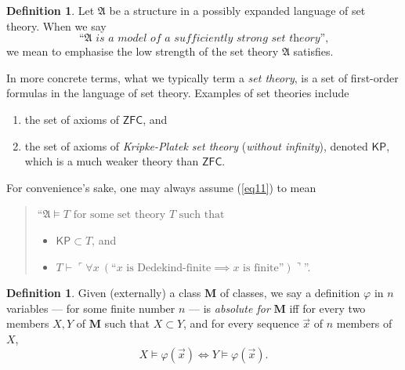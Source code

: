 \documentclass[12pt, twoside]{memoir}
\numberwithin{equation}{section}
\theoremstyle{definition}
\newtheorem{defi}[thm]{Definition}
\theoremstyle{remark}
\theoremstyle{definition}
\theoremstyle{definition}
\theoremstyle{definition}
\theoremstyle{remark}
\begin{document}
\begin{defi}
Let $\mathfrak{A}$ be a structure in a possibly expanded language of set theory. When we say 
\begin{equation}\label{eq11}
    \text{``}\mathfrak{A} \textit{ is a model of a sufficiently strong set theory'',} 
\end{equation}
we mean to emphasise the low strength of the set theory $\mathfrak{A}$ satisfies. 

In more concrete terms, what we typically term a \emph{set theory}, is a set of first-order formulas in the language of set theory. Examples of set theories include
\begin{enumerate}[label=(\roman*)]
    \item the set of axioms of $\mathsf{ZFC}$, and
    \item the set of axioms of \textit{Kripke-Platek set theory} (\emph{without infinity}), denoted $\mathsf{KP}$, which is a much weaker theory than $\mathsf{ZFC}$.
\end{enumerate} 
For convenience's sake, one may always assume (\ref{eq11}) to mean 
\begin{quote}
    $\text{``}\mathfrak{A} \models T \text{ for some set theory } T \text{ such that}$ 
    \begin{itemize}
        \item $\mathsf{KP} \subset T$, and
        \item $T \vdash \ulcorner \forall x \ (\text{``} x \text{ is Dedekind-finite} \implies x \text{ is finite''}) \urcorner$''.
    \end{itemize}
\end{quote}
\end{defi}

\begin{defi}
Given (externally) a class $\mathbf{M}$ of classes, we say a definition $\varphi$ in $n$ variables --- for some finite number $n$ --- is \emph{absolute for} $\mathbf{M}$ iff for every two members $X, Y$ of $\mathbf{M}$ such that $X \subset Y$, and for every sequence $\Vec{x}$ of $n$ members of $X$,
\begin{equation*}
    X \models \varphi(\Vec{x}) \iff Y \models \varphi(\Vec{x}) \text{.}
\end{equation*}
\end{defi}
\end{document}
